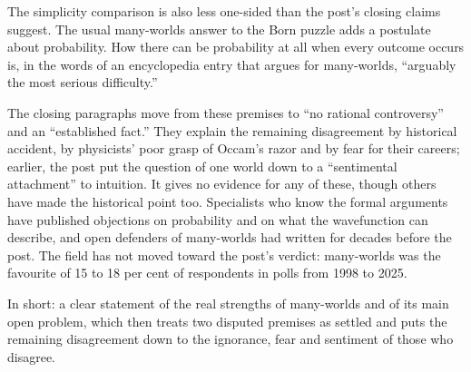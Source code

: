 \begin{afterword}
The simplicity comparison is also less one-sided than the post's closing claims suggest. The usual many-worlds answer to the Born puzzle adds a postulate about probability. How there can be probability at all when every outcome occurs is, in the words of an encyclopedia entry that argues for many-worlds, ``arguably the most serious difficulty.''

The closing paragraphs move from these premises to ``no rational controversy'' and an ``established fact.'' They explain the remaining disagreement by historical accident, by physicists' poor grasp of Occam's razor and by fear for their careers; earlier, the post put the question of one world down to a ``sentimental attachment'' to intuition. It gives no evidence for any of these, though others have made the historical point too. Specialists who know the formal arguments have published objections on probability and on what the wavefunction can describe, and open defenders of many-worlds had written for decades before the post. The field has not moved toward the post's verdict: many-worlds was the favourite of 15 to 18 per cent of respondents in polls from 1998 to 2025.

In short: a clear statement of the real strengths of many-worlds and of its main open problem, which then treats two disputed premises as settled and puts the remaining disagreement down to the ignorance, fear and sentiment of those who disagree.
\end{afterword}

